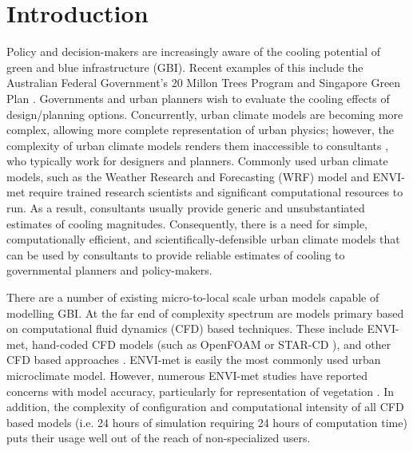 \documentclass[gmd, manuscript]{copernicus}
\begin{document}




\section{Introduction}\label{sec:introduction}



Policy and decision-makers  are  increasingly aware of the cooling potential of  green and blue infrastructure (GBI). Recent examples of this include the Australian Federal Government's 20 Millon Trees Program \citep{CommonwealthofAustralia2017} and Singapore Green Plan \citep{SMEWR2012}.  Governments and urban planners wish to evaluate the cooling effects of design/planning options. Concurrently, urban climate models are becoming more  complex, allowing more complete representation of  urban physics; however, the complexity of urban climate models renders them inaccessible to consultants \citep{Elasson2000}, who typically work for designers and planners. Commonly used urban climate models, such as the Weather Research and Forecasting (WRF) model 
\citep{Skamarock2008} and ENVI-met \citep{Bruse1999} require trained research scientists and significant computational resources to run. As a result, consultants usually provide generic and unsubstantiated estimates of cooling magnitudes. Consequently, there is a need for simple, computationally efficient, and  scientifically-defensible urban climate models that can be used by consultants to provide reliable estimates of cooling to governmental planners and policy-makers. 

There are a number of existing micro-to-local scale urban models capable of modelling GBI. At the far end of complexity spectrum are models primary based on computational fluid dynamics (CFD) based techniques. These include ENVI-met, hand-coded  CFD models (such as OpenFOAM \citep{OpenFOAM2011} or STAR-CD \citep{CDadapco2011}), and other CFD based approaches \citep{Bailey2014,Bailey2016,Kunz2000,Schlunzen2011a,Yamada2011,Bruse1999}. ENVI-met is easily the most commonly used urban microclimate model. However, numerous  ENVI-met studies have reported concerns with  model accuracy, particularly for representation of vegetation  \citep{Ali-Toudert2006b,Kruger2011,Acero2015,Spangenberg2008}. In addition, the complexity of configuration and computational intensity of all CFD based models (i.e. 24 hours of simulation requiring 24 hours of computation time) puts their usage well out of the reach of non-specialized users. 
\end{document}
